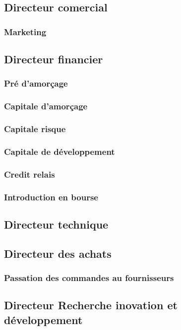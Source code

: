 	\subsection{Directeur comercial}
		\subsubsection{Marketing}
	\subsection{Directeur financier}
		\subsubsection{Pré d'amorçage}
		\subsubsection{Capitale d'amorçage}
		\subsubsection{Capitale risque}
		\subsubsection{Capitale de développement}
		\subsubsection{Credit relais}
		\subsubsection{Introduction en bourse}
	\subsection{Directeur technique}
	\subsection{Directeur des achats}
		\subsubsection{Passation des commandes au fournisseurs}
	\subsection{Directeur Recherche inovation et développement}

